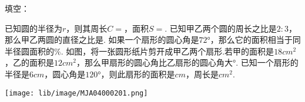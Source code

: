 填空：

\begin{subquestions}
    \subquestion 已知圆的半径为$r$，则其周长$C=$\key{}，面积$S=$\key{}.
    \subquestion 已知甲乙两个圆的周长之比是$2:3$，那么甲乙两圆的直径之比是.
    \subquestion 如果一个扇形的圆心角是$72°$，那么它的面积相当于同半径圆面积的\key{}$\%$.
    \subquestion 如图，将一张圆形纸片剪开成甲乙两个扇形.若甲的面积是$18cm^2$，乙的面积是$12cm^2$，那么甲扇形的圆心角比乙扇形的圆心角大\key{}°.
    \subquestion 已知一个扇形的半径是$6cm$，圆心角是$120°$，则此扇形的面积是\key{}$cm$，周长是\key{}$cm^2$.
    

\end{subquestions}
\begin{center}
    \texttt{[image: lib/image/MJA04000201.png]}
\end{center}